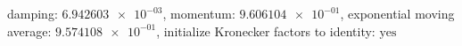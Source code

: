 damping: $\num[scientific-notation=true]{6.942603e-03}$, momentum: $\num[scientific-notation=true]{9.606104e-01}$, exponential moving average: $\num[scientific-notation=true]{9.574108e-01}$, initialize Kronecker factors to identity: $\text{yes}$